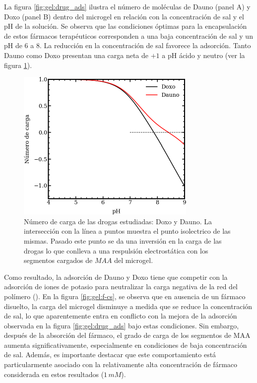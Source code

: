 La figura \ref{fig:gel:drug_ads} ilustra el n\'umero de mol\'eculas de Dauno (panel A) y Doxo (panel B) dentro del microgel en relaci\'on con la concentraci\'on de sal y el pH de la soluci\'on. Se observa que las condiciones \'optimas para la encapsulaci\'on de estos f\'armacos terap\'euticos corresponden a una baja concentraci\'on de sal y un pH de 6 a 8. La reducci\'on en la concentraci\'on de sal favorece la adsorci\'on. Tanto Dauno como Doxo presentan una carga neta de $+1$ a pH \'acido y neutro (ver la figura \ref{fig:gel:carga-drug_ads}).

\begin{figure}[!tb]
	\centering
	\includegraphics[width=0.55\linewidth]{Figures/graph-gel/drugs-Q.pdf}
	\caption{N\'umero de carga de las drogas estudiadas: Doxo y Dauno. La intersecci\'on con la l\'inea a puntos muestra el punto isolectrico de las mismas. Pasado este punto se da una inversi\'on en la carga de las drogas lo que conlleva a una respulsi\'on electrost\'atica con los segmentos cargados de $MAA$ del microgel. }
	\label{fig:gel:carga-drug_ads}
\end{figure}

Como resultado, la adsorci\'on de Dauno y Doxo tiene que competir con la adsorci\'on de iones de potasio para neutralizar la carga negativa de la red del pol\'imero (\citet{PerezChavez2020}). En la figura \ref{fig:gel:f-cs}, se observa que en ausencia de un f\'armaco disuelto, la carga del microgel disminuye a medida que se reduce la concentraci\'on de sal, lo que aparentemente entra en conflicto con la mejora de la adsorci\'on observada en la figura \ref{fig:gel:drug_ads} bajo estas condiciones. Sin embargo, despu\'es de la absorci\'on del f\'armaco, el grado de carga de los segmentos de MAA aumenta significativamente, especialmente en condiciones de baja concentraci\'on de sal. Adem\'as, es importante destacar que este comportamiento est\'a particularmente asociado con la relativamente alta concentraci\'on de f\'armaco considerada en estos resultados ($1\, mM$).

